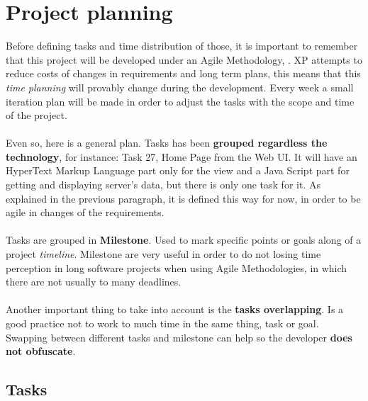 
\chapter{Project planning}

\label{chapter09}

Before defining tasks and time distribution of those, it is important to remember that this project will be developed under an Agile Methodology, . XP attempts to reduce costs of changes in requirements and long term plans, this means that this \textit{time planning} will provably change during the development. Every week a small iteration plan will be made in order to adjust the tasks with the scope and time of the project.
\\\\
Even so, here is a general plan. Tasks has been \textbf{grouped regardless the technology}, for instance\cite{w3_templates}: Task 27, Home Page from the Web UI. It will have an HyperText Markup Language part only for the view and a Java Script part for getting and displaying server's data, but there is only one task for it. As explained in the previous paragraph, it is defined this way for now, in order to be agile in changes of the requirements.
\\\\
Tasks are grouped in \textbf{Milestone}. Used to mark specific points or goals along of a project \textit{timeline}. Milestone are very useful in order to do not losing time perception in long software projects when using Agile Methodologies, in which there are not usually to many deadlines.
\\\\
Another important thing to take into account is the \textbf{tasks overlapping}. Is a good practice\cite{clean_coder} not to work to much time in the same thing, task or goal. Swapping between different tasks and milestone can help so the developer \textbf{does not obfuscate}.


\section{Tasks}


